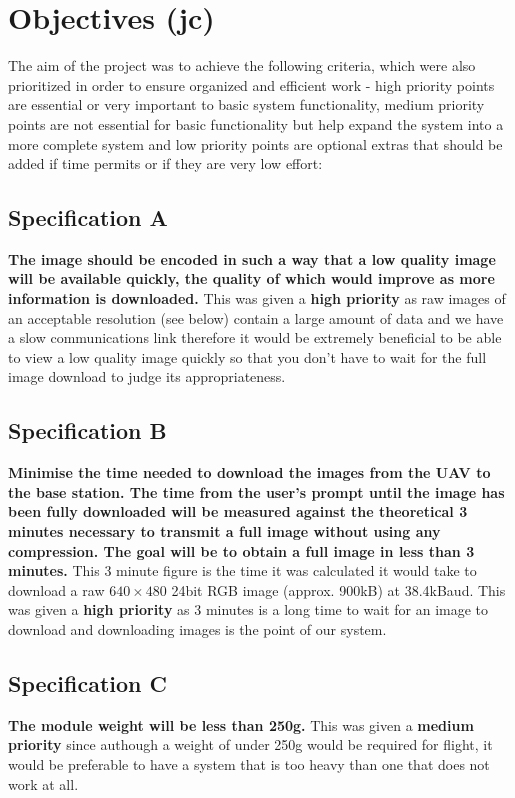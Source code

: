 \section{Objectives (jc)} 

The aim of the project was to achieve the following criteria, which were also prioritized in order to ensure organized and efficient work - high priority points are essential or very important to basic system functionality, medium priority points are not essential for basic functionality but help expand the system into a more complete system and low priority points are optional extras that should be added if time permits or if they are very low effort:

	\subsection{Specification A}\label{sec:spec_a} \textbf{The image should be encoded in such a way that a low quality image will be available quickly, the quality of which would improve as more information is downloaded.} This was given a \textbf{high priority} as raw images of an acceptable resolution (see below) contain a large amount of data and we have a slow communications link therefore it would be extremely beneficial to be able to view a low quality image quickly so that you don't have to wait for the full image download to judge its appropriateness.
	\subsection{Specification B}\label{sec:spec_b} \textbf{Minimise the time needed to download the images from the UAV to the base station. The time from the user’s prompt until the image has been fully downloaded will be measured against the theoretical 3 minutes necessary to transmit a full image without using any compression. The goal will be to obtain a full image in \textbf{less than 3 minutes.}} 
This 3 minute figure is the time it was calculated it would take to download a raw $640\times480$ 24bit RGB image (approx. 900kB) at 38.4kBaud. This was given a \textbf{high priority} as 3 minutes is a long time to wait for an image to download and downloading images is the point of our system.
	\subsection{Specification C}\label{sec:spec_c} \textbf{The module weight will be \textbf{less than 250g}.} 
This was given a \textbf{medium priority} since authough a weight of under 250g would be required for flight, it would be preferable to have a system that is too heavy than one that does not work at all.%
